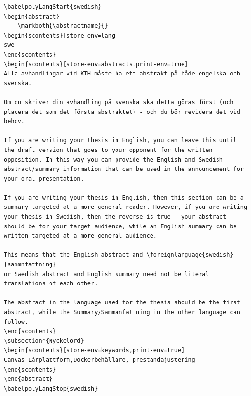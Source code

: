 \begin{lstlisting}[language={[LaTeX]TeX}, caption={Example of the revised format for entering an abstract}, label=lst:babel]
\babelpolyLangStart{swedish}
\begin{abstract}
    \markboth{\abstractname}{}
\begin{scontents}[store-env=lang]
swe
\end{scontents}
\begin{scontents}[store-env=abstracts,print-env=true]
Alla avhandlingar vid KTH måste ha ett abstrakt på både engelska och svenska.

Om du skriver din avhandling på svenska ska detta göras först (och placera det som det första abstraktet) - och du bör revidera det vid behov.

If you are writing your thesis in English, you can leave this until the draft version that goes to your opponent for the written opposition. In this way you can provide the English and Swedish abstract/summary information that can be used in the announcement for your oral presentation.

If you are writing your thesis in English, then this section can be a summary targeted at a more general reader. However, if you are writing your thesis in Swedish, then the reverse is true – your abstract should be for your target audience, while an English summary can be written targeted at a more general audience.

This means that the English abstract and \foreignlanguage{swedish}{sammnfattning} 
or Swedish abstract and English summary need not be literal translations of each other.

The abstract in the language used for the thesis should be the first abstract, while the Summary/Sammanfattning in the other language can follow.
\end{scontents}
\subsection*{Nyckelord}
\begin{scontents}[store-env=keywords,print-env=true]
Canvas Lärplattform,Dockerbehållare, prestandajustering
\end{scontents}
\end{abstract}
\babelpolyLangStop{swedish}
\end{lstlisting}
	

